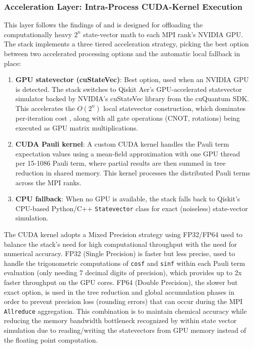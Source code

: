 \subsubsection{Acceleration Layer: Intra-Process CUDA-Kernel Execution}
This layer follows the findings of \textcite{bayraktar2023cuquantum} and is designed for 
offloading the computationally heavy $2^n$ state-vector math to each MPI rank's NVIDIA GPU. The stack implements a three
tiered acceleration strategy, picking the best option between two accelerated processing options and the automatic local fallback in place:
\begin{enumerate}
    \item \textbf{GPU statevector (cuStateVec)}: Best option, used when an NVIDIA GPU is detected. The stack switches to Qiskit Aer's GPU-accelerated statevector simulator backed by NVIDIA's cuStateVec library from the cuQuantum SDK. This accelerates the $O(2^n)$ local statevector construction, which dominates per-iteration cost \parencite{bayraktar2023cuquantum}, along with all gate operations (CNOT, rotations) being executed as GPU matrix multiplications.
    \item \textbf{CUDA Pauli kernel}: A custom CUDA kernel handles the Pauli term expectation values using a mean-field approximation with one GPU thread per 15-1086 Pauli term, where partial results are then summed in tree reduction in shared memory. This kernel processes the distributed Pauli terms across the MPI ranks.
    \item \textbf{CPU fallback}: When no GPU is available, the stack falls back to Qiskit's CPU-based Python/C++ \texttt{Statevector} class for exact (noiseless) state-vector simulation. 
\end{enumerate}

The CUDA kernel adopts a Mixed Precision strategy using FP32/FP64 used to balance the stack's need 
for high computational throughput with the need for numerical accuracy. FP32 (Single Precision) is faster but less
precise, used to handle the trigonometric computations of \texttt{cosf} and \texttt{sinf} within each Pauli term evaluation (only needing 7 decimal digits of precision), which provides up to 2x faster throughput 
on the GPU cores. FP64 (Double Precision), the slower but exact option, is used in the tree reduction and global accumulation phases in 
order to prevent precision loss (rounding errors) that can occur during the MPI \texttt{Allreduce} 
aggregation. This combination is to maintain chemical accuracy while reducing the memory bandwidth bottleneck recognized by
\textcite{bayraktar2023cuquantum} within state vector simulation due to reading/writing the statevectors from GPU memory instead of the floating point computation.

